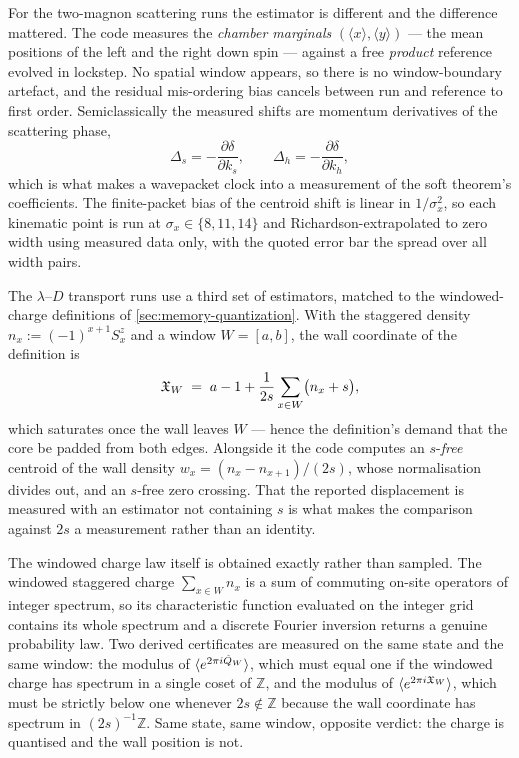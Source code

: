 For the two-magnon scattering runs the estimator is different and the
difference mattered. The code measures the \emph{chamber marginals}
$(\langle x\rangle, \langle y\rangle)$ --- the mean positions of the left and
the right down spin --- against a free \emph{product} reference evolved in
lockstep. No spatial window appears, so there is no window-boundary artefact,
and the residual mis-ordering bias cancels between run and reference to first
order. Semiclassically the measured shifts are momentum derivatives of the
scattering phase,
\begin{equation}
  \Delta_s = -\frac{\partial\delta}{\partial k_s}, \qquad
  \Delta_h = -\frac{\partial\delta}{\partial k_h},
  \label{eq:num-wigner}
\end{equation}
which is what makes a wavepacket clock into a measurement of the soft
theorem's coefficients. The finite-packet bias of the centroid shift is
linear in $1/\sigma_x^2$, so each kinematic point is run at
$\sigma_x\in\{8,11,14\}$ and Richardson-extrapolated to zero width using
measured data only, with the quoted error bar the spread over all width pairs.

The $\lambda$--$D$ transport runs use a third set of estimators, matched to
the windowed-charge definitions of \cref{sec:memory-quantization}. With the
staggered density $n_x := (-1)^{x+1}S^z_x$ and a window $W=[a,b]$, the wall
coordinate of the definition is
\begin{equation}
  \mathfrak{X}_W \;=\; a - 1 + \frac{1}{2s}\sum_{x\in W}\bigl(n_x + s\bigr),
  \label{eq:num-XW}
\end{equation}
which saturates once the wall leaves $W$ --- hence the definition's demand
that the core be padded from both edges. Alongside it the code computes an
$s$-\emph{free} centroid of the wall density $w_x = (n_x-n_{x+1})/(2s)$, whose
normalisation divides out, and an $s$-free zero crossing. That the reported
displacement is measured with an estimator not containing $s$ is what makes
the comparison against $2s$ a measurement rather than an identity.

The windowed charge law itself is obtained exactly rather than sampled. The
windowed staggered charge $\sum_{x\in W}n_x$ is a sum of commuting on-site
operators of integer spectrum, so its characteristic function evaluated on the
integer grid contains its whole spectrum and a discrete Fourier inversion
returns a genuine probability law. Two derived certificates are measured on
the same state and the same window: the modulus of
$\langle e^{2\pi i \hat{Q}_{W}}\rangle$, which must equal one if the windowed
charge has spectrum in a single coset of $\mathbb{Z}$, and the modulus of
$\langle e^{2\pi i \mathfrak{X}_W}\rangle$, which must be strictly below one
whenever $2s\notin\mathbb{Z}$ because the wall coordinate has spectrum in
$(2s)^{-1}\mathbb{Z}$. Same state, same window, opposite verdict: the charge is
quantised and the wall position is not.

